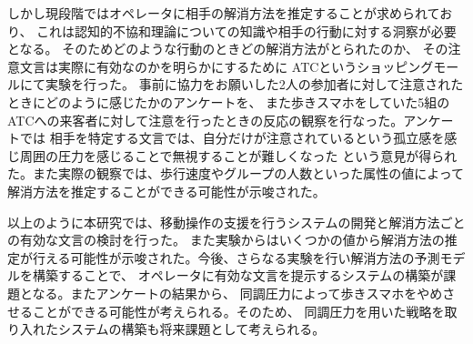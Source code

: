 \documentclass{kuisthesis}
\begin{document}
\begin{jabstract}
しかし現段階ではオペレータに相手の解消方法を推定することが求められており、
これは認知的不協和理論についての知識や相手の行動に対する洞察が必要となる。
そのためどのような行動のときどの解消方法がとられたのか、
その注意文言は実際に有効なのかを明らかにするために
ATCというショッピングモールにて実験を行った。
事前に協力をお願いした2人の参加者に対して注意されたときにどのように感じたかのアンケートを、
また歩きスマホをしていた5組のATCへの来客者に対して注意を行ったときの反応の観察を行なった。アンケートでは
相手を特定する文言では、自分だけが注意されているという孤立感を感じ周囲の圧力を感じることで無視することが難しくなった
という意見が得られた。また実際の観察では、歩行速度やグループの人数といった属性の値によって解消方法を推定することができる可能性が示唆された。

以上のように本研究では、移動操作の支援を行うシステムの開発と解消方法ごとの有効な文言の検討を行った。
また実験からはいくつかの値から解消方法の推定が行える可能性が示唆された。今後、さらなる実験を行い解消方法の予測モデルを構築することで、
オペレータに有効な文言を提示するシステムの構築が課題となる。またアンケートの結果から、
同調圧力によって歩きスマホをやめさせることができる可能性が考えられる。そのため、
同調圧力を用いた戦略を取り入れたシステムの構築も将来課題として考えられる。
\end{jabstract}
\end{document}
